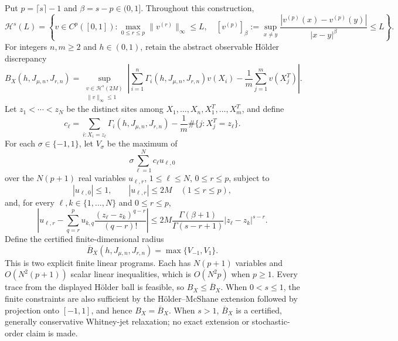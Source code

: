 Put \(p=\lceil s\rceil-1\) and \(\beta=s-p\in(0,1]\). Throughout this construction,
\[
\mathcal H^s(L)=\left\{v\in C^p([0,1]):
\max_{0\le r\le p}\|v^{(r)}\|_\infty\le L,
\quad
[v^{(p)}]_{\beta}:=\sup_{x\ne y}\frac{|v^{(p)}(x)-v^{(p)}(y)|}{|x-y|^\beta}\le L
\right\}.
\]
For integers \(n,m\ge2\) and \(h\in(0,1)\), retain the abstract observable H\"older discrepancy
\[
B_X(h,J_{\mu,n},J_{r,n})=
\sup_{\substack{v\in\mathcal H^s(2M)\\ \|v\|_\infty\le1}}
\left|\sum_{i=1}^n\Gamma_i(h,J_{\mu,n},J_{r,n})v(X_i)-\frac1m\sum_{j=1}^mv(X_j^T)\right|.
\]
Let \(z_1<\cdots<z_N\) be the distinct sites among \(X_1,\ldots,X_n,X_1^T,\ldots,X_m^T\), and define
\[
c_\ell=\sum_{i:X_i=z_\ell}\Gamma_i(h,J_{\mu,n},J_{r,n})
-\frac1m\#\{j:X_j^T=z_\ell\}.
\]
For each \(\sigma\in\{-1,1\}\), let \(V_\sigma\) be the maximum of
\[
\sigma\sum_{\ell=1}^Nc_\ell u_{\ell,0}
\]
over the \(N(p+1)\) real variables \(u_{\ell,r}\), \(1\le\ell\le N\), \(0\le r\le p\), subject to
\[
|u_{\ell,0}|\le1,
\qquad
|u_{\ell,r}|\le2M\quad(1\le r\le p),
\]
and, for every \(\ell,k\in\{1,\ldots,N\}\) and \(0\le r\le p\),
\[
\left|u_{\ell,r}-\sum_{q=r}^p
u_{k,q}\frac{(z_\ell-z_k)^{q-r}}{(q-r)!}\right|
\le
2M\frac{\Gamma(\beta+1)}{\Gamma(s-r+1)}|z_\ell-z_k|^{s-r}.
\]
Define the certified finite-dimensional radius
\[
\overline B_X(h,J_{\mu,n},J_{r,n})=\max\{V_{-1},V_1\}.
\]
This is two explicit finite linear programs. Each has \(N(p+1)\) variables and \(O(N^2(p+1))\) scalar linear inequalities, which is \(O(N^2p)\) when \(p\ge1\). Every trace from the displayed H\"older ball is feasible, so \(B_X\le\overline B_X\). When \(0<s\le1\), the finite constraints are also sufficient by the H\"older--McShane extension followed by projection onto \([-1,1]\), and hence \(B_X=\overline B_X\). When \(s>1\), \(\overline B_X\) is a certified, generally conservative Whitney-jet relaxation; no exact extension or stochastic-order claim is made.